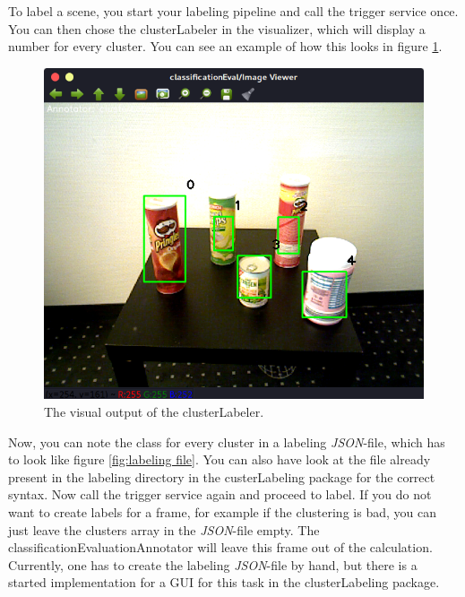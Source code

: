 \documentclass[main.tex]{subfiles}
\begin{document}
To label a scene, you start your labeling pipeline and call the trigger service once. You can then chose the clusterLabeler in the visualizer, which will display a number for every cluster. You can see an example of how this looks in figure \ref{fig:clusterLabeler visualization}.
\begin{figure}
  \includegraphics[width=\linewidth]{pictures/perception/cluster_numbering.png}
  \caption{The visual output of the clusterLabeler.}
  \label{fig:clusterLabeler visualization}
\end{figure}

\newpage


Now, you can note the class for every cluster in a labeling \textit{JSON}-file, which has to look like figure \ref{fig:labeling file}. You can also have look at the file already present in the labeling directory in the custerLabeling package for the correct syntax. Now call the trigger service again and proceed to label. If you do not want to create labels for a frame, for example if the clustering is bad, you can just leave the clusters array in the \textit{JSON}-file empty. The classificationEvaluationAnnotator will leave this frame out of the calculation. Currently, one has to create the labeling \textit{JSON}-file by hand, but there is a started implementation for a GUI for this task in the clusterLabeling package.
\end{document}
